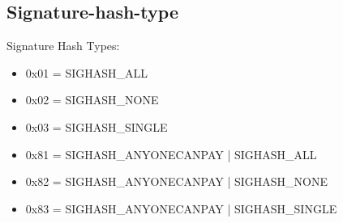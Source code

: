 \subsection{Signature-hash-type}

Signature Hash Types:
\begin{itemize}
    \item 0x01 = SIGHASH\_ALL
    \item 0x02 = SIGHASH\_NONE
    \item 0x03 = SIGHASH\_SINGLE
    \item 0x81 = SIGHASH\_ANYONECANPAY | SIGHASH\_ALL
    \item 0x82 = SIGHASH\_ANYONECANPAY | SIGHASH\_NONE
    \item 0x83 = SIGHASH\_ANYONECANPAY | SIGHASH\_SINGLE
\end{itemize}
